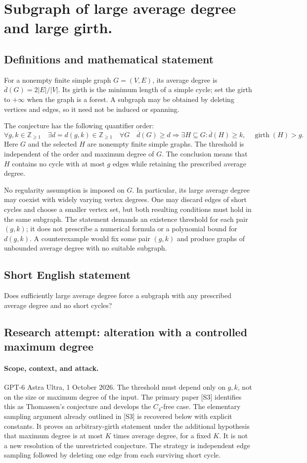 \documentclass[11pt,a4paper]{article}
\begin{document}
\section*{Subgraph of large average degree and large girth.}\label{statement}

\subsection{Definitions and mathematical statement}
For a nonempty finite simple graph $G=(V,E)$, its average degree
is $\overline d(G)=2|E|/|V|$. Its girth is the minimum length of
a simple cycle; set the girth to $+\infty$ when the graph is a
forest. A subgraph may be obtained by deleting vertices and
edges, so it need not be induced or spanning.

The conjecture has the following quantifier order:
\[
 \forall g,k\in\mathbb Z_{\geq1}\quad
 \exists d=d(g,k)\in\mathbb Z_{\geq1}\quad
 \forall G\quad
 \overline d(G)\geq d\Longrightarrow
 \exists H\subseteq G:
 \overline d(H)\geq k,\quad\operatorname{girth}(H)>g.
\]
Here $G$ and the selected $H$ are nonempty finite simple graphs.
The threshold is independent of the order and maximum degree
of $G$. The conclusion means that $H$ contains no cycle with at
most $g$ edges while retaining the prescribed average degree.

No regularity assumption is imposed on $G$. In particular, its
large average degree may coexist with widely varying vertex
degrees. One may discard edges of short cycles and choose a
smaller vertex set, but both resulting conditions must hold in
the same subgraph. The statement demands an existence threshold
for each pair $(g,k)$; it does not prescribe a numerical formula
or a polynomial bound for $d(g,k)$. A counterexample would fix
some pair $(g,k)$ and produce graphs of unbounded average degree
with no suitable subgraph.
\subsection{Short English statement}
Does sufficiently large average degree force a subgraph with any prescribed average degree and no short cycles?
\subsection{Research attempt: alteration with a controlled maximum degree}
\paragraph{Scope, context, and attack.}
GPT-6 Astra Ultra, 1 October 2026. The threshold must depend only on
$g,k$, not on the size or maximum degree of the input. The primary
paper [S3] identifies this as Thomassen's conjecture and develops the
$C_4$-free case. The elementary sampling argument already outlined in [S3] is recovered
below with explicit constants. It proves an arbitrary-girth statement
under the additional hypothesis that maximum degree is at most
$K$ times average degree, for a fixed $K$. It is not a new resolution
of the unrestricted conjecture. The strategy is independent edge sampling
followed by deleting one edge from each surviving short cycle.
\end{document}
